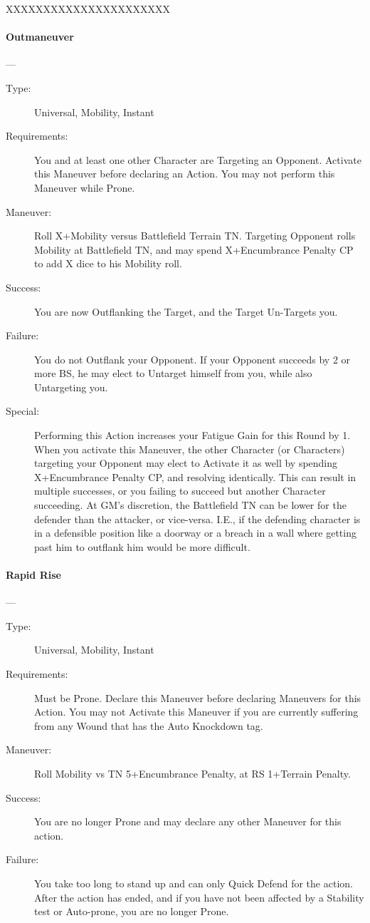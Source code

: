 \documentclass[oneside,11pt,english]{book}
\begin{document}
XXXXXXXXXXXXXXXXXXXXXX 

\paragraph{\large\label{man:Outmaneuver}Outmaneuver}---
\vspace{-10pt}\begin{description} 
\item [Type:] Universal, Mobility, Instant 
\item [Requirements:] You and at least one other Character are Targeting an
  Opponent. Activate this Maneuver before declaring an Action. You may not
  perform this Maneuver while Prone.
\item [Maneuver:] Roll X+Mobility versus Battlefield Terrain TN. Targeting
  Opponent rolls Mobility at Battlefield TN, and may spend X+Encumbrance Penalty
  CP to add X dice to his Mobility roll.
\item [Success:] You are now Outflanking the Target, and the Target Un-Targets
  you.
\item [Failure:] You do not Outflank your Opponent. If your Opponent succeeds by
  2 or more BS, he may elect to Untarget himself from you, while also
  Untargeting you.
\item [Special:] Performing this Action increases your Fatigue Gain for this
  Round by 1. When you activate this Maneuver, the other Character (or
  Characters) targeting your Opponent may elect to Activate it as well by
  spending X+Encumbrance Penalty CP, and resolving identically. This can result
  in multiple successes, or you failing to succeed but another Character
  succeeding. At GM’s discretion, the Battlefield TN can be lower for the
  defender than the attacker, or vice-versa. I.E., if the defending character is
  in a defensible position like a doorway or a breach in a wall where getting
  past him to outflank him would be more difficult.
\end{description}
\paragraph{\large\label{man:Rapid Rise}Rapid Rise}---
\vspace{-10pt}\begin{description} 
\item [Type:] Universal, Mobility, Instant 
\item [Requirements:] Must be Prone. Declare this Maneuver before declaring
  Maneuvers for this Action. You may not Activate this Maneuver if you are
  currently suffering from any Wound that has the Auto Knockdown tag.
\item [Maneuver:] Roll Mobility vs TN 5+Encumbrance Penalty, at RS 1+Terrain
  Penalty.
\item [Success:] You are no longer Prone and may declare any other Maneuver for
  this action.
\item [Failure:] You take too long to stand up and can only Quick Defend for the
  action. After the action has ended, and if you have not been affected by a
  Stability test or Auto-prone, you are no longer Prone.
\end{description}
\end{document}
